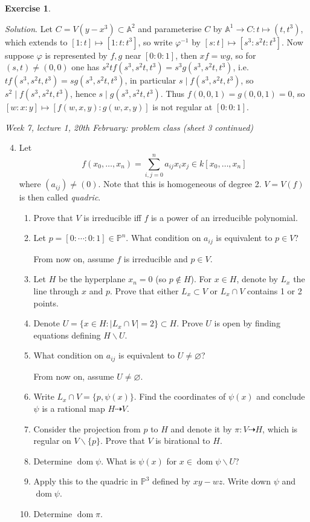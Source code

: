 \documentclass{article}
\newcommand{\A}{\mathbb{A}}
\newcommand{\p}{\mathbb{P}}
\newcommand{\dom}{\operatorname{dom}}
\theoremstyle{definition}
\newtheorem{exe}[defn]{Exercise}
\begin{document}
\begin{exe}
\begin{enumerate}
\textit{Solution}. Let $C=V(y-x^3)\subset\A^2$ and parameterise $C$ by $\A^1\rightarrow C:t\mapsto (t,t^3)$, which extends to $[1:t]\mapsto [1:t:t^3]$, so write $\varphi^{-1}$ by $[s:t]\mapsto [s^3:s^2t:t^3]$. Now suppose $\varphi$ is represented by $f,g$ near $[0:0:1]$, then $xf=wg$, so for $(s,t)\neq (0,0)$ one has $s^2tf(s^3,s^2t,t^3)=s^3g(s^3,s^2t,t^3)$, i.e. $tf(s^3,s^2t,t^3)=sg(s^3,s^2t,t^3)$, in particular $s\mid f(s^3,s^2t,t^3)$, so $s^2\mid f(s^3,s^2t,t^3)$, hence $s\mid g(s^3,s^2t,t^3)$. Thus $f(0,0,1)=g(0,0,1)=0$, so $[w:x:y]\mapsto [f(w,x,y):g(w,x,y)]$ is not regular at $[0:0:1]$.
\end{enumerate}

\begin{flushright}
\textit{Week 7, lecture 1, 20th February: problem class (sheet 3 continued)}
\end{flushright}

\begin{enumerate}
\setcounter{enumi}{3}
\item Let
\[
f(x_0,\ldots,x_n)=\sum_{i,j=0}^n a_{ij}x_ix_j\in k[x_0,\ldots,x_n]
\]
where $(a_{ij})\neq (0)$. Note that this is homogeneous of degree 2. $V=V(f)$ is then called \textit{quadric}.
\begin{enumerate}
\item Prove that $V$ is irreducible iff $f$ is a power of an irreducible polynomial.
\item Let $p=[0:\cdots:0:1]\in\p^n$. What condition on $a_{ij}$ is equivalent to $p\in V$?

From now on, assume $f$ is irreducible and $p\in V$.

\item Let $H$ be the hyperplane $x_n=0$ (so $p\notin H$). For $x\in H$, denote by $L_x$ the line through $x$ and $p$. Prove that either $L_x\subset V$ or $L_x\cap V$ contains 1 or 2 points.
\item Denote $U=\{x\in H:|L_x\cap V|=2\}\subset H$. Prove $U$ is open by finding equations defining $H\backslash U$.
\item What condition on $a_{ij}$ is equivalent to $U\neq\varnothing$?

From now on, assume $U\neq\varnothing$.

\item Write $L_x\cap V=\{p,\psi(x)\}$. Find the coordinates of $\psi(x)$ and conclude $\psi$ is a rational map $H\dashrightarrow V$.
\item Consider the projection from $p$ to $H$ and denote it by $\pi:V\dashrightarrow H$, which is regular on $V\backslash\{p\}$. Prove that $V$ is birational to $H$.
\item Determine $\dom\psi$. What is $\psi(x)$ for $x\in\dom\psi\backslash U$?
\item Apply this to the quadric in $\p^3$ defined by $xy-wz$. Write down $\psi$ and $\dom\psi$.
\item Determine $\dom\pi$.
\end{enumerate}


\end{enumerate}
\end{exe}
\end{document}
